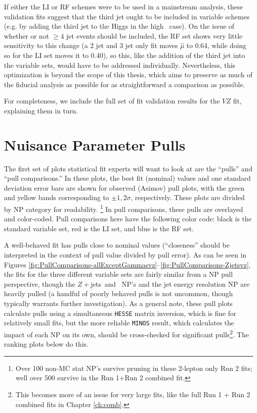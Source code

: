 If either the LI or RF schemes were to be used in a mainstream analysis, these validation fits suggest that the third jet ought to be included in variable schemes (e.g. by adding the third jet to the Higgs in the high \ptv\, case).  On the issue of whether or not $\ge4$ jet events should be included, the RF set shows very little sensitivity to this change (a 2 jet and 3 jet only fit moves $\hat{\mu}$ to 0.64, while doing so for the LI set moves it to 0.40), so this, like the addition of the third jet into the variable sets, would have to be addressed individually.  Nevertheless, this optimization is beyond the scope of this thesis, which aims to preserve as much of the fiducial analysis as possible for as straightforward a comparison as possible.  

  For completeness, we include the full set of fit validation results for the $VZ$ fit, explaining them in turn.  

\section{Nuisance Parameter Pulls}
The first set of plots statistical fit experts will want to look at are the ``pulls'' and ``pull comparisons.''  In these plots, the best fit (nominal) values and one standard deviation error bars are shown for observed (Asimov) pull plots, with the green and yellow bands corresponding to $\pm1,2\sigma$, respectively.  These plots are divided by NP category for readability.  \footnote{Over 100 non-MC stat NP's survive pruning in these 2-lepton only Run 2 fits; well over 500 survive in the Run 1+Run 2 combined fit.}  In pull comparisons, these pulls are overlayed and color-coded.  Pull comparisons here have the following color code: black is the standard variable set, red is the LI set, and blue is the RF set.  

A well-behaved fit has pulls close to nominal values (``closeness'' should be interpreted in the context of pull value divided by pull error).  As can be seen in Figures \ref{fig:PullComparisons-allExceptGammasvz}--\ref{fig:PullComparisons-Zjetsvz}, the fits for the three different variable sets are fairly similar from a NP pull perspective, though the $Z+$jets \mbb\,and \ptv\, NP's and the jet energy resolution NP are heavily pulled (a handful of poorly behaved pulls is not uncommon, though typically warrants further investigation).  As a general note, these pull plots calculate pulls using a simultaneous \texttt{HESSE} matrix inversion, which is fine for relatively small fits, but the more reliable \texttt{MINOS} result, which calculates the impact of each NP on its own, should be cross-checked for significant pulls\footnote{This becomes more of an issue for very large fits, like the full Run 1 + Run 2 combined fits in Chapter \ref{ch:comb}.}.  The ranking plots below do this.

